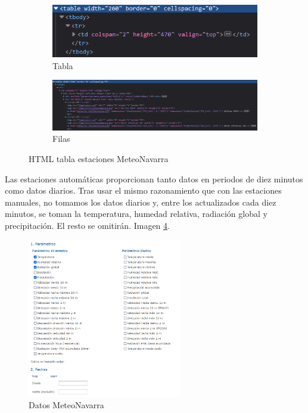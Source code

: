 \begin{figure} [H]
	\centering
	\begin{subfigure}{.5\textwidth}
		\centering
		\includegraphics[width=.8\linewidth]{fig/MeteoNavarraCodeHTMLTable.png}
		\caption{Tabla}
		\label{fig:sub5}
	\end{subfigure}%
	\begin{subfigure}{.5\textwidth}
		\centering
		\includegraphics[width=.9\linewidth]{fig/MeteoNavarraCodeHTML.png}
		\caption{Filas}
		\label{fig:sub6}
	\end{subfigure}
	\caption{HTML tabla estaciones MeteoNavarra}
	\label{fig:ej28}
\end{figure}

Las estaciones automáticas proporcionan tanto datos en periodos de diez minutos como datos diarios. Tras usar el mismo razonamiento que con las estaciones manuales, no tomamos los datos diarios y, entre los actualizados cada diez minutos, se toman la temperatura, humedad relativa, radiación global y precipitación. El resto se omitirán. Imagen \ref{fig:ej6}.

\begin{figure} [H]
	\centering
	\includegraphics[width=0.6\textwidth]{fig/DatosMeteoNavarra.png}
	\caption[Apartado selección de datos MeteoNavarra]{Datos MeteoNavarra}
	\label{fig:ej6}
\end{figure}

